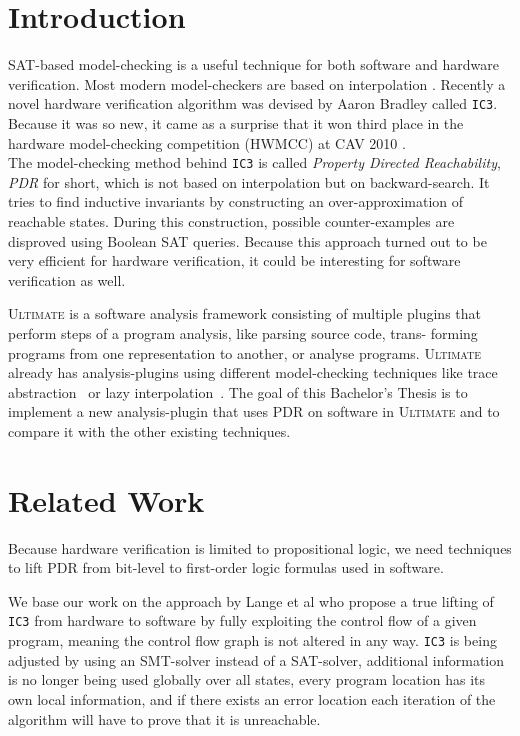 \documentclass[11pt, a4paper, BCOR=10mm, ngerman]{scrbook}
\begin{document}
\chapter{Introduction}
SAT-based model-checking is a useful technique for both software and hardware verification. Most modern model-checkers are based on interpolation \cite{DBLP:conf/cav/VizelG14}. 
Recently a novel hardware verification algorithm was devised by Aaron Bradley \cite{DBLP:conf/vmcai/Bradley11} called \texttt{IC3}.
Because it was so new, it came as a surprise that it won third place in the hardware
model-checking competition (HWMCC) at CAV 2010 \cite{cav}. \\ The model-checking method behind \texttt{IC3} is called \textsl{Property Directed Reachability}, \textsl{PDR} for short, which is not based on interpolation but on backward-search. It tries to find inductive invariants by constructing an over-approximation of reachable states. During this construction, possible counter-examples are disproved using Boolean SAT queries. Because this approach turned out to be very efficient for hardware verification, it could be interesting for software verification as well. \\ \par
\textsc{\textsc{Ultimate}} \cite{Zitat02} is a software analysis framework consisting of multiple plugins that perform steps of a program analysis, like parsing source code, trans-
forming programs from one representation to another, or analyse programs.
 \textsc{\textsc{Ultimate}} already has analysis-plugins using different model-checking techniques like trace abstraction~\cite{DBLP:conf/cav/HeizmannHP13} or lazy interpolation~\cite{DBLP:conf/popl/HenzingerJMS02}.
The goal of this Bachelor's Thesis is to implement a new analysis-plugin that uses PDR on software in \textsc{\textsc{Ultimate}} and to compare it with the other existing techniques.


\chapter{Related Work}

Because hardware verification is limited to propositional logic, we need techniques to lift PDR from bit-level to first-order logic formulas used in software. \par We base our work on the approach by Lange et al \cite{DBLP:conf/fmcad/0001NN15} who propose a true lifting of \texttt{IC3} from hardware to software by fully exploiting the control flow of a given program, meaning the control flow graph is not altered in any way. \texttt{IC3} is being adjusted by using an SMT-solver instead of a SAT-solver, additional information is no longer being used globally over all states, every program location has its own local information, and if there exists an error location each iteration of the algorithm will have to prove that it is unreachable. \par
\end{document}
